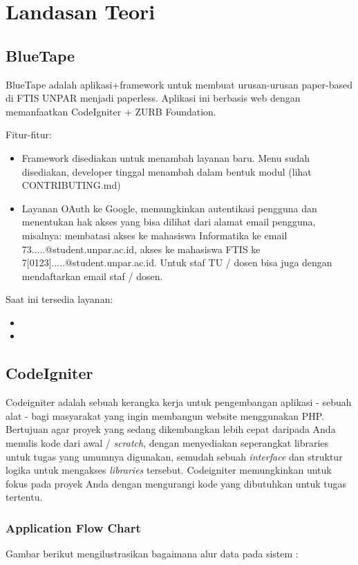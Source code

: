 \chapter{Landasan Teori}
\label{chap:teori}

\section{BlueTape}
\label{sec:bluetape}
BlueTape adalah aplikasi+framework untuk membuat urusan-urusan paper-based di FTIS UNPAR menjadi paperless. Aplikasi ini berbasis web dengan memanfaatkan CodeIgniter + ZURB Foundation.

Fitur-fitur:
\begin{itemize}
  \item Framework disediakan untuk menambah layanan baru. Menu sudah disediakan, developer tinggal menambah dalam bentuk modul (lihat CONTRIBUTING.md)
  \item Layanan OAuth ke Google, memungkinkan autentikasi pengguna dan menentukan hak akses yang bisa dilihat dari alamat email pengguna, misalnya: membatasi akses ke mahasiswa Informatika ke email 73.....@student.unpar.ac.id, akses ke mahasiswa FTIS ke 7[0123].....@student.unpar.ac.id. Untuk staf TU / dosen bisa juga dengan mendaftarkan email staf / dosen.
\end{itemize}

Saat ini tersedia layanan:
\begin{itemize}
	\item
	\item
\end{itemize}


\section{CodeIgniter}
\label{sec:code_igniter}
Codeigniter adalah sebuah kerangka kerja untuk pengembangan aplikasi - sebuah alat - bagi masyarakat yang ingin membangun website menggunakan PHP. Bertujuan agar proyek yang sedang dikembangkan lebih cepat daripada Anda menulis kode dari awal / \textit{scratch}, dengan menyediakan seperangkat libraries untuk tugas yang umumnya digunakan, semudah sebuah \textit{interface} dan struktur logika untuk mengakses \textit{libraries} tersebut. Codeigniter memungkinkan untuk fokus pada proyek Anda dengan mengurangi kode yang dibutuhkan untuk tugas tertentu. \cite{codeigniter:17}
\subsection{Application Flow Chart}
\label{subs:app_flowchart}
Gambar berikut mengilustrasikan bagaimana alur data pada sistem :

